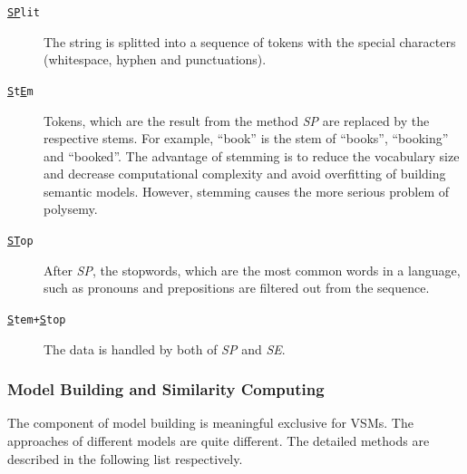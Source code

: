 \begin{description}
\item[\texttt{\underline{SP}lit}] The string is splitted into a sequence of tokens with the special characters (whitespace, hyphen and punctuations). 
\item[\texttt{\underline{S}t\underline{E}m}] Tokens, which are the result from the method \textit{SP} are replaced by the respective stems. For example, ``book'' is the stem of ``books'', ``booking'' and ``booked''. The advantage of stemming is to reduce the vocabulary size and decrease computational complexity and avoid overfitting of building semantic models. However, stemming causes the more serious problem of polysemy. 
\item[\texttt{\underline{ST}op}] After \textit{SP}, the stopwords, which are the most common words in a language, such as pronouns and prepositions are filtered out from the sequence. 
\item[\texttt{\underline{S}tem+\underline{S}top}] The data is handled by both of \textit{SP} and \textit{SE}. 
\end{description}


\subsubsection{Model Building and Similarity Computing}
The component of model building is meaningful exclusive for VSMs. The approaches of different models are quite different. The detailed methods are described in the following list respectively.

